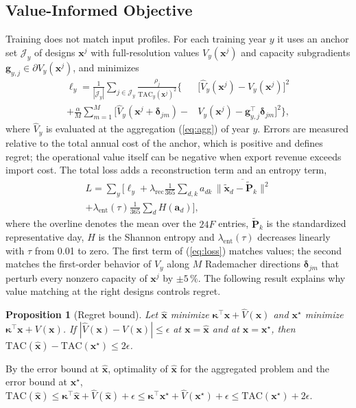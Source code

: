 \documentclass[journal]{IEEEtran}
\newtheorem{proposition}{Proposition}
\begin{document}
\subsection{Value-Informed Objective}
Training does not match input profiles. For each training year $y$ it uses an anchor set $\mathcal{J}_y$ of designs $\bm{x}^{j}$ with full-resolution values $V_y(\bm{x}^{j})$ and capacity subgradients $\bm{g}_{y,j}\in\partial V_y(\bm{x}^{j})$, and minimizes
\begin{align}
\ell_y=\frac{1}{|\mathcal{J}_y|}\sum_{j\in\mathcal{J}_y}\frac{\rho_j}{\mathrm{TAC}_y(\bm{x}^{j})^2}\Big\{&\big[\hat{V}_y(\bm{x}^{j})-V_y(\bm{x}^{j})\big]^2 \nonumber\\
+\frac{\alpha}{M}\sum_{m=1}^{M}\big[\hat{V}_y(\bm{x}^{j}+\bm{\delta}_{jm})-&V_y(\bm{x}^{j})-\bm{g}_{y,j}^{\top}\bm{\delta}_{jm}\big]^2\Big\}, \label{eq:loss}
\end{align}
where $\hat{V}_y$ is evaluated at the aggregation (\ref{eq:agg}) of year $y$. Errors are measured relative to the total annual cost of the anchor, which is positive and defines regret; the operational value itself can be negative when export revenue exceeds import cost. The total loss adds a reconstruction term and an entropy term,
\begin{multline}
L=\sum_{y}\Big[\ell_y+\lambda_{\mathrm{rec}}\frac{1}{365}\sum_{d,k}a_{dk}\,\overline{\|\tilde{\bm{x}}_d-\tilde{\bm{P}}_k\|^2}\\
+\lambda_{\mathrm{ent}}(\tau)\frac{1}{365}\sum_{d}H(\bm{a}_d)\Big], \label{eq:totalloss}
\end{multline}
where the overline denotes the mean over the $24F$ entries, $\tilde{\bm{P}}_k$ is the standardized representative day, $H$ is the Shannon entropy and $\lambda_{\mathrm{ent}}(\tau)$ decreases linearly with $\tau$ from 0.01 to zero. The first term of (\ref{eq:loss}) matches values; the second matches the first-order behavior of $V_y$ along $M$ Rademacher directions $\bm{\delta}_{jm}$ that perturb every nonzero capacity of $\bm{x}^{j}$ by $\pm5\,\%$. The following result explains why value matching at the right designs controls regret.

\begin{proposition}[Regret bound]\label{prop:regret}
Let $\hat{\bm{x}}$ minimize $\bm{\kappa}^{\top}\bm{x}+\hat{V}(\bm{x})$ and $\bm{x}^{\star}$ minimize $\bm{\kappa}^{\top}\bm{x}+V(\bm{x})$. If $|\hat{V}(\bm{x})-V(\bm{x})|\le\epsilon$ at $\bm{x}=\hat{\bm{x}}$ and at $\bm{x}=\bm{x}^{\star}$, then $\mathrm{TAC}(\hat{\bm{x}})-\mathrm{TAC}(\bm{x}^{\star})\le 2\epsilon$.
\end{proposition}
\begin{IEEEproof}
By the error bound at $\hat{\bm{x}}$, optimality of $\hat{\bm{x}}$ for the aggregated problem and the error bound at $\bm{x}^{\star}$,
$\mathrm{TAC}(\hat{\bm{x}})\le\bm{\kappa}^{\top}\hat{\bm{x}}+\hat{V}(\hat{\bm{x}})+\epsilon\le\bm{\kappa}^{\top}\bm{x}^{\star}+\hat{V}(\bm{x}^{\star})+\epsilon\le\mathrm{TAC}(\bm{x}^{\star})+2\epsilon$.
\end{IEEEproof}
\end{document}
